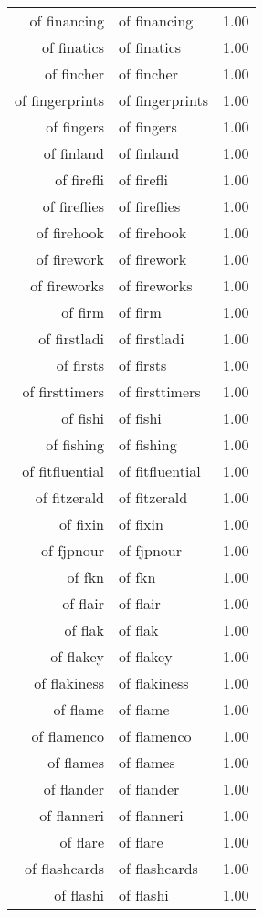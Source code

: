 \begin{table}[ht]
\begin{tabular}{rlr}
  of financing & of financing & 1.00 \\ 
  of finatics & of finatics & 1.00 \\ 
  of fincher & of fincher & 1.00 \\ 
  of fingerprints & of fingerprints & 1.00 \\ 
  of fingers & of fingers & 1.00 \\ 
  of finland & of finland & 1.00 \\ 
  of firefli & of firefli & 1.00 \\ 
  of fireflies & of fireflies & 1.00 \\ 
  of firehook & of firehook & 1.00 \\ 
  of firework & of firework & 1.00 \\ 
  of fireworks & of fireworks & 1.00 \\ 
  of firm & of firm & 1.00 \\ 
  of firstladi & of firstladi & 1.00 \\ 
  of firsts & of firsts & 1.00 \\ 
  of firsttimers & of firsttimers & 1.00 \\ 
  of fishi & of fishi & 1.00 \\ 
  of fishing & of fishing & 1.00 \\ 
  of fitfluential & of fitfluential & 1.00 \\ 
  of fitzerald & of fitzerald & 1.00 \\ 
  of fixin & of fixin & 1.00 \\ 
  of fjpnour & of fjpnour & 1.00 \\ 
  of fkn & of fkn & 1.00 \\ 
  of flair & of flair & 1.00 \\ 
  of flak & of flak & 1.00 \\ 
  of flakey & of flakey & 1.00 \\ 
  of flakiness & of flakiness & 1.00 \\ 
  of flame & of flame & 1.00 \\ 
  of flamenco & of flamenco & 1.00 \\ 
  of flames & of flames & 1.00 \\ 
  of flander & of flander & 1.00 \\ 
  of flanneri & of flanneri & 1.00 \\ 
  of flare & of flare & 1.00 \\ 
  of flashcards & of flashcards & 1.00 \\ 
  of flashi & of flashi & 1.00 \\ 

\end{tabular}
\end{table}
